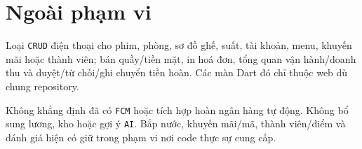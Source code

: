 \clearpage
\section{Ngoài phạm vi}\label{sec:srs-24}
Loại \texttt{CRUD} điện thoại cho phim, phòng, sơ đồ ghế, suất, tài khoản, menu, khuyến mãi hoặc thành viên; bán quầy/\allowbreak{}tiền mặt, in hoá đơn, tổng quan vận hành/\allowbreak{}doanh thu và duyệt/\allowbreak{}từ chối/\allowbreak{}ghi chuyển tiền hoàn. Các màn Dart đó chỉ thuộc web dù chung repository.

Không khẳng định đã có \texttt{FCM} hoặc tích hợp hoàn ngân hàng tự động. Không bổ sung lương, kho hoặc gợi ý \texttt{AI}. Bắp nước, khuyến mãi/\allowbreak{}mã, thành viên/\allowbreak{}điểm và đánh giá hiện có giữ trong phạm vi nơi code thực sự cung cấp.
